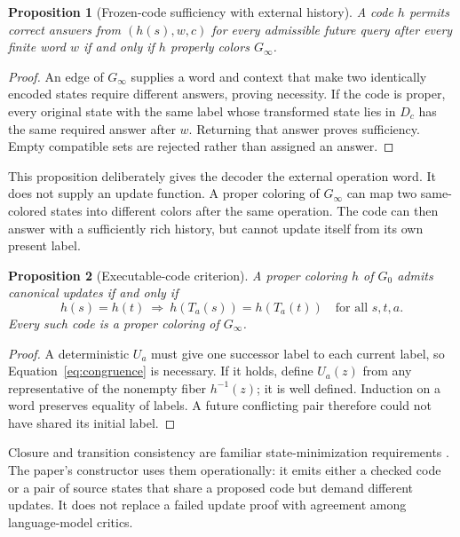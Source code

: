 \documentclass[11pt,letterpaper]{article}
\newtheorem{proposition}{Proposition}[section]
\theoremstyle{remark}\newtheorem{remark}{Remark}[section]
\begin{document}
\begin{proposition}[Frozen-code sufficiency with external history]\label{prop:history}
A code $h$ permits correct answers from $(h(s),w,c)$ for every admissible future query after every finite word $w$ if and only if $h$ properly colors $G_\infty$.
\end{proposition}
\begin{proof}
An edge of $G_\infty$ supplies a word and context that make two identically encoded states require different answers, proving necessity. If the code is proper, every original state with the same label whose transformed state lies in $D_c$ has the same required answer after $w$. Returning that answer proves sufficiency. Empty compatible sets are rejected rather than assigned an answer.
\end{proof}

This proposition deliberately gives the decoder the external operation word. It does not supply an update function. A proper coloring of $G_\infty$ can map two same-colored states into different colors after the same operation. The code can then answer with a sufficiently rich history, but cannot update itself from its own present label.

\begin{proposition}[Executable-code criterion]\label{prop:executable}
A proper coloring $h$ of $G_0$ admits canonical updates if and only if
\begin{equation}
 h(s)=h(t)\ \Longrightarrow\ h(T_a(s))=h(T_a(t))\quad\text{for all }s,t,a.\label{eq:congruence}
\end{equation}
Every such code is a proper coloring of $G_\infty$.
\end{proposition}
\begin{proof}
A deterministic $U_a$ must give one successor label to each current label, so Equation~\eqref{eq:congruence} is necessary. If it holds, define $U_a(z)$ from any representative of the nonempty fiber $h^{-1}(z)$; it is well defined. Induction on a word preserves equality of labels. A future conflicting pair therefore could not have shared its initial label.
\end{proof}

Closure and transition consistency are familiar state-minimization requirements \citep{kam,pena,givan}. The paper's constructor uses them operationally: it emits either a checked code or a pair of source states that share a proposed code but demand different updates. It does not replace a failed update proof with agreement among language-model critics.
\end{document}
